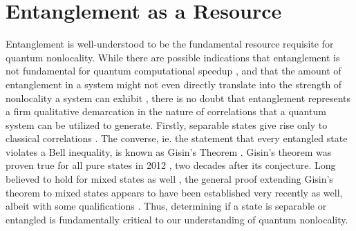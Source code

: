 \documentclass[
  12pt          %
  ,letterpaper  %
  ,center       %
  ,noupper      %
  ,english,fleqn]{uconnthesis}
\let\stdsection\section
\renewcommand\section{\newpage\stdsection}
\begin{document}
\section{Entanglement as a Resource}
Entanglement is well-understood to be the fundamental resource requisite for quantum nonlocality. While there are possible indications that entanglement is not fundamental for quantum computational speedup \cite{DQC1Original,Discord2001,DQC1,Discord2010,Discord2011,NegativityPostDiscord,MinEntangComputing}, and that the amount of entanglement in a system might not even directly translate into the strength of nonlocality a system can exhibit \cite{UPBOriginal,EntanglementSurprise2005,EntanglementSurprise2005b,EntanglementSurprise2007,EntanglementSurprise2011,EntanglementSurprise2014,RandomnessFromNonlocality,SteeringNonlocalityBrunner,SteeringNonlocalityArXiv,EntanglementInequivalent2014}, there is no doubt that entanglement represents a firm qualitative demarcation in the nature of correlations that a quantum system can be utilized to generate. Firstly, separable states give rise only to classical correlations \cite{UnifiedCorrelations}. The converse, ie. the statement that every entangled state violates a Bell inequality, is known as Gisin's Theorem \cite{Gisin1991,GisinPure2012,EnhancedGisinSteering,shimony2009quantum}. Gisin's theorem was proven true for all pure states in 2012  \cite{GisinPure2012}, two decades after its conjecture. Long believed to hold for mixed states as well \cite{acin2001bound,DiscreteEntanglementNonlocality}, the general proof extending Gisin's theorem to mixed states appears to have been established very recently as well, albeit with some qualifications \cite{AllEntangledNonlocality,SteeringEllipsoids,EnhancedGisinSteering,AllEntangledNonlocal,CloserConnections}. Thus, determining if a state is separable or entangled is fundamentally critical to our understanding of quantum nonlocality. 
\end{document}
